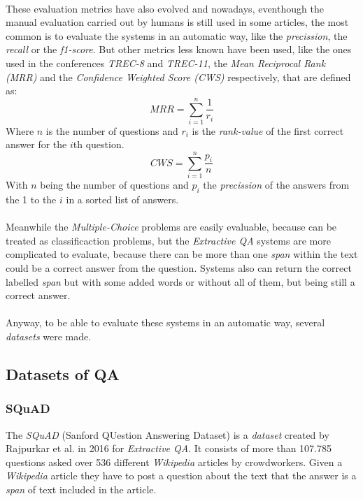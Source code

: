 \paragraph{}
These evaluation metrics have also evolved and nowadays, eventhough the manual evaluation carried out by humans is still used in some articles, the most common is to evaluate the systems in an automatic way, like the \emph{precission}, the \emph{recall} or the \emph{f1-score}. But other metrics less known have been used, like the ones used in the conferences \emph{TREC-8} and \emph{TREC-11}, the \emph{Mean Reciprocal Rank (MRR)} and the \emph{Confidence Weighted Score (CWS)} respectively, that are defined as:
\begin{equation}
MRR = \sum_{i=1}^{n}\frac{1}{r_{i}}
\label{eq:mrr}
\end{equation}
Where $n$ is the number of questions and $r_{i}$ is the \emph{rank-value} of the first correct answer for the $i$th question.
\begin{equation}
CWS = \sum_{i=1}^{n}\frac{p_{i}}{n}
\label{eq:cws}
\end{equation}
With $n$ being the number of questions and $p_{i}$ the \emph{precission} of the answers from the 1 to the $i$ in a sorted list of answers.
\paragraph{}
Meanwhile the \emph{Multiple-Choice} problems are easily evaluable, because can be treated as classificaction problems, but the \emph{Extractive QA} systems are more complicated to evaluate, because there can be more than one \emph{span} within the text could be a correct answer from the question. Systems also can return the correct labelled \emph{span} but with some added words or without all of them, but being still a correct answer.
\paragraph{}
Anyway, to be able to evaluate these systems in an automatic way, several \emph{datasets} were made.
\subsection{Datasets of QA}
\label{sec:qa-datasets}
\subsubsection{SQuAD}
\label{sec:squad}
The \emph{SQuAD} (Sanford QUestion Answering Dataset)\cite{Rajpurkar2016} is a \emph{dataset} created by Rajpurkar et al. in 2016 for \emph{Extractive QA}. It consists of more than 107.785 questions asked over 536 different \emph{Wikipedia} articles by crowdworkers. Given a \emph{Wikipedia} article they have to post a question about the text that the answer is a \emph{span} of text included in the article.
